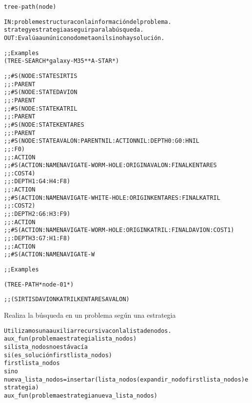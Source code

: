 \begin{aibox}{\function}
\begin{alltt}
tree-path (node)


IN: problem 	estructura con la información del problema.
	strategy 	estrategia a seguir para la búsqueda.
OUT: Evalúa a un único nodo meta o nil si no hay solución.

\end{alltt}
\end{aibox}

\begin{aibox}{\examples}
\begin{alltt}
;; Examples
(TREE-SEARCH *galaxy-M35* *A-STAR*)

;;\#S(NODE :STATE SIRTIS
;;   :PARENT
;;   \#S(NODE :STATE DAVION
;;      :PARENT
;;      \#S(NODE :STATE KATRIL
;;         :PARENT
;;         \#S(NODE :STATE KENTARES
;;            :PARENT
;;            \#S(NODE :STATE AVALON :PARENT NIL :ACTION NIL :DEPTH 0 :G 0 :H NIL
;;               :F 0)
;;            :ACTION
;;            \#S(ACTION :NAME NAVIGATE-WORM-HOLE :ORIGIN AVALON :FINAL KENTARES
;;               :COST 4)
;;            :DEPTH 1 :G 4 :H 4 :F 8)
;;         :ACTION
;;         \#S(ACTION :NAME NAVIGATE-WHITE-HOLE :ORIGIN KENTARES :FINAL KATRIL
;;            :COST 2)
;;         :DEPTH 2 :G 6 :H 3 :F 9)
;;      :ACTION
;;      \#S(ACTION :NAME NAVIGATE-WORM-HOLE :ORIGIN KATRIL :FINAL DAVION :COST 1)
;;      :DEPTH 3 :G 7 :H 1 :F 8)
;;   :ACTION
;;   \#S(ACTION :NAME NAVIGATE-W

;; Examples 

(TREE-PATH *node-01*)

;;(SIRTIS DAVION KATRIL KENTARES AVALON)


\end{alltt}
\end{aibox}

\begin{aibox}{\comments}
Realiza la búsqueda en un problema según una estrategia

\end{aibox}

\begin{aibox}{\pseudocode}
\begin{alltt}
Utilizamos una auxiliar recursiva con la lista de nodos.
aux\_fun(problema estrategia lista\_nodos)
	si lista\_nodos no está vacía
		si ( es\_solución first lista\_nodos)
			first lista\_nodos
		sino
			nueva\_lista\_nodos = insertar(lista\_nodos (expandir\_nodo first lista\_nodos) estrategia)
			aux\_fun (problema estrategia nueva\_lista\_nodos)


\end{alltt}
\end{aibox}

